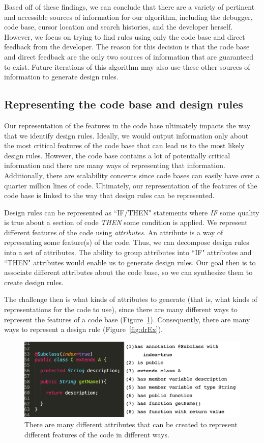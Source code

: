 \documentclass[12pt]{article}
\begin{document}
Based off of these findings, we can conclude that there are a variety of pertinent and accessible sources of information for our algorithm, including the debugger, code base, cursor location and search histories, and the developer herself. However, we focus on trying to find rules using only the code base and direct feedback from the developer. The reason for this decision is that the code base and direct feedback are the only two sources of information that are guaranteed to exist. Future iterations of this algorithm may also use these other sources of information to generate design rules.

\subsection{Representing the code base and design rules}
Our representation of the features in the code base ultimately impacts the way that we identify design rules. Ideally, we would output information only about the most critical features of the code base that can lead us to the most likely design rules. However, the code base contains a lot of potentially critical information and there are many ways of representing that information. Additionally, there are scalability concerns since code bases can easily have over a quarter million lines of code. Ultimately, our representation of the features of the code base is linked to the way that design rules can be represented.

Design rules can be represented as ``IF/THEN" statements where \textit{IF} some quality is true about a section of code \textit{THEN} some condition is applied. We represent different features of the code using \textit{attributes}. An attribute is a way of representing some feature(s) of the code. Thus, we can decompose design rules into a set of attributes. The ability to group attributes into ``IF" attributes and ``THEN" attributes would enable us to generate design rules. Our goal then is to associate different attributes about the code base, so we can synthesize them to create design rules. 

The challenge then is what kinds of attributes to generate (that is, what kinds of representations for the code to use), since there are many different ways to represent the features of a code base (Figure~\ref{fig:attrEx}). Consequently, there are many ways to represent a design rule (Figure~\ref{fig:drEx}). 

\begin{figure}[h!]
  \includegraphics[width=\linewidth]{attributeEx.png}
  \caption{There are many different attributes that can be created to represent different features of the code in different ways.}
  \label{fig:attrEx}
\end{figure}
\end{document}
